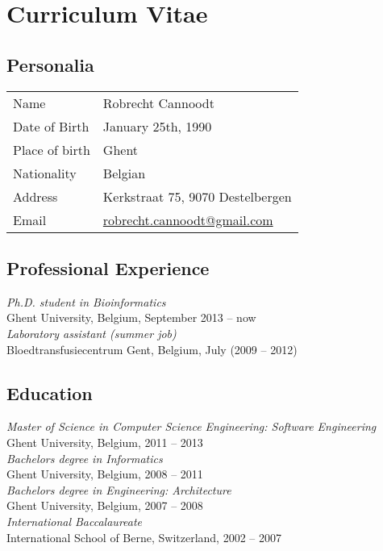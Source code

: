 \appendix


\newpage{\thispagestyle{empty}\cleardoublepage}
\chapter{Curriculum Vitae}
\section{Personalia}
\begin{tabular}{ll}
	Name & Robrecht Cannoodt \\
	Date of Birth & January 25th, 1990 \\
	Place of birth & Ghent \\
	Nationality & Belgian \\
	Address & Kerkstraat 75, 9070 Destelbergen \\
	Email & \href{mailto:robrecht.cannoodt@gmail.com}{robrecht.cannoodt@gmail.com}
\end{tabular}


\section{Professional Experience}
\textit{Ph.D. student in Bioinformatics} \\
\hspace*{2 ex} Ghent University, Belgium, September 2013 -- now \\
\textit{Laboratory assistant (summer job)} \\
\hspace*{2 ex} Bloedtransfusiecentrum Gent, Belgium, July (2009 -- 2012)


\section{Education} 
\textit{Master of Science in Computer Science Engineering: Software Engineering} \\
\hspace*{2 ex} Ghent University, Belgium, 2011 -- 2013 \vspace*{1mm}\\ 
\textit{Bachelors degree in Informatics}\\
\hspace*{2 ex} Ghent University, Belgium, 2008 -- 2011 \vspace*{1mm} \\
\textit{Bachelors degree in Engineering: Architecture} \\
\hspace*{2 ex} Ghent University, Belgium, 2007 -- 2008  \vspace*{1mm}\\
\textit{International Baccalaureate} \\
\hspace*{2 ex} International School of Berne, Switzerland, 2002 -- 2007


